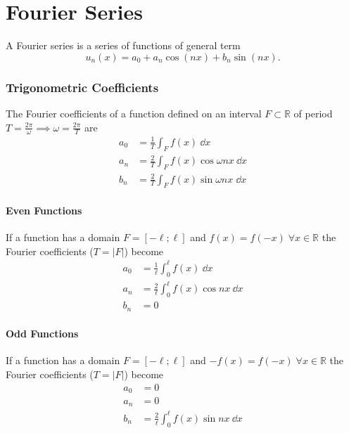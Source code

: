\part{Fourier Series}
\begin{definition}
	A Fourier series is a series of functions of general term
	\[
		u_n(x)=a_0 + a_n \cos(nx)+b_n\sin(nx)
		.\]
\end{definition}

\section{Trigonometric Coefficients}
The Fourier coefficients of a function defined on an interval $F \subset \mathbb{R}$ of period $T=\frac{2\pi}{\omega}\implies\omega=\frac{2\pi}{T}$ are 
\begin{align*}
    a_0 &= \frac{1}{T}\int_F f(x)\:\dd{x}\\
    a_n&=\frac{2}{T}\int_F f(x) \cos \omega nx \: \dd{x}\\
    b_n&=\frac{2}{T}\int_F f(x) \sin \omega nx\; \dd{x}
\end{align*} 

\subsection{Even Functions}
If a function has a domain $F=[-\ell;\ell]$ and $f(x)=f(-x)\;\forall x\in \mathbb{R}$ the Fourier coefficients ($T=|F|$) become 
\begin{align*}
    a_0&=\frac{1}{\ell}\int_0^\ell f(x)\:\dd{x}\\
    a_n&=\frac{2}{\ell}\int_0^\ell f(x) \cos nx\:\dd{x}\\
    b_n&=0
\end{align*}

\subsection{Odd Functions}
If a function has a domain $F=[-\ell;\ell]$ and $-f(x)=f(-x)\;\forall x\in \mathbb{R}$ the Fourier coefficients ($T=|F|$) become 
\begin{align*}
    a_0&=0\\
    a_n&=0\\
    b_n&=\frac{2}{\ell}\int_0^\ell f(x) \sin nx \: \dd {x}
\end{align*}


